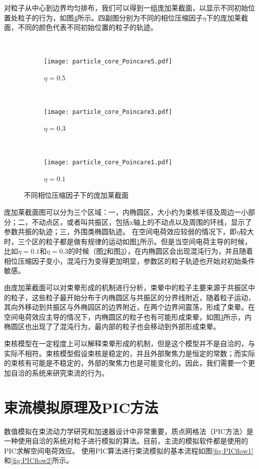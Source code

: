 对粒子从中心到边界均匀排布，我们可以得到一组庞加莱截面，以显示不同初始位置处粒子的行为，如图\ref{fig:particle_core_Poincare}所示。四副图分别为不同的相位压缩因子$\eta$下的庞加莱截面，不同的颜色代表不同初始位置的粒子的轨迹。
\begin{figure}[!htbp]
  \centering
  ~%
  \begin{subfigure}[b]{0.6\textwidth}
    \texttt{[image: particle\_core\_Poincare5.pdf]}
    \caption{$\eta = 0.5$}
    \label{fig:particle_core_Poincare5}
  \end{subfigure}
  ~
  \begin{subfigure}[b]{0.6\textwidth}
    \texttt{[image: particle\_core\_Poincare3.pdf]}
    \caption{$\eta = 0.3$}
    \label{fig:particle_core_Poincare3}
  \end{subfigure}%
  ~
  \begin{subfigure}[b]{0.6\textwidth}
    \texttt{[image: particle\_core\_Poincare1.pdf]}
    \caption{$\eta = 0.1$}
    \label{fig:particle_core_Poincare1}
  \end{subfigure}%
  \caption{不同相位压缩因子下的庞加莱截面}
  \label{fig:particle_core_Poincare}
\end{figure}

庞加莱截面图可以分为三个区域：一，内椭圆区，大小约为束核半径及周边一小部分；二，不动点区，或者叫共振区，包括x轴上的不动点以及周围的环线，显示了参数共振的轨迹；三，外围类椭圆轨迹。
在空间电荷效应较弱的情况下，即$\eta$较大时，三个区的粒子都是做有规律的运动如图\ref{fig:particle_core_Poincare5}所示。但是当空间电荷主导的时候，比如$\eta=0.1$和$\eta=0.3$的时候（图\ref{fig:particle_core_Poincare3}和图\ref{fig:particle_core_Poincare1}），在内椭圆区会出现混沌行为，并且随着相位压缩因子变小，混沌行为变得更加明显，参数区的粒子轨迹也开始对初始条件敏感。

由庞加莱截面可以对束晕形成的机制进行分析，束晕中的粒子主要来源于共振区中的粒子，这些粒子最开始分布于内椭圆区与共振区的分界线附近，随着粒子运动，其向外移动到共振区与外椭园区的边界附近，在两个边界间震荡，形成了束晕。在空间电荷效应主导的情况下，内椭圆区的粒子也有可能形成束晕，如图\ref{fig:particle_core_Poincare1}所示，内椭圆区也出现了了混沌行为，最内部的粒子也会移动到外部形成束晕。

束核模型在一定程度上可以解释束晕形成的机制，但是这个模型并不是自洽的，与实际不相符。束核模型假设束核是稳定的，并且外部聚焦力是恒定的常数；而实际的束核有可能是不稳定的，外部的聚焦力也是可能变化的。因此，我们需要一个更加自洽的系统来研究束流的行为。

\section{束流模拟原理及PIC方法}   \label{section:PIC_algorithm}
数值模拟在束流动力学研究和加速器设计中非常重要，质点网格法（PIC方法）是一种使用自洽的系统对粒子进行模拟的算法。目前，主流的模拟软件都是使用的PIC求解空间电荷效应\cite{PIC_Birdsall1991, PIC_friedman1992, PIC_ji2000, PIC_ji2004, PIC_Amundson2006229, PIC_tracewin2014, PIC_beampath2005}。
使用PIC算法进行束流模拟的基本流程如图\ref{fig:PICflow1}和\ref{fig:PICflow2}所示。

